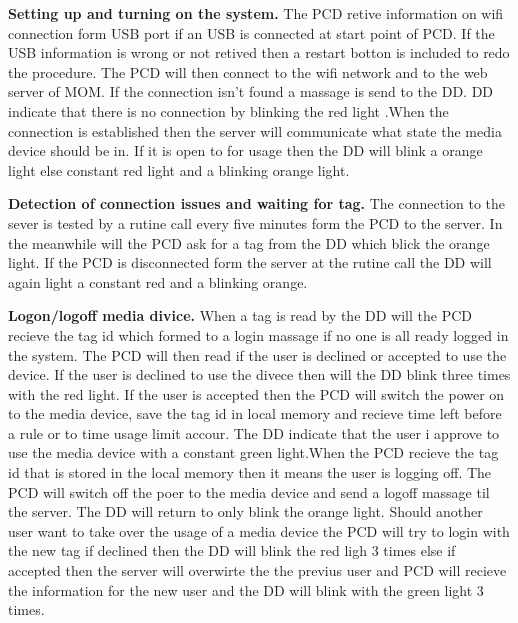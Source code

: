 \textbf{Setting up and turning on the system.} \n
The PCD retive information on wifi connection form USB port if an USB is connected at start point of PCD. 
If the USB information is wrong or not retived then a restart botton is included to redo the procedure.  \n
The PCD will then connect to the wifi network and to the web server of MOM. If the connection isn't found a massage is send to the DD. \n DD indicate that there is no connection by blinking the red light .\n When the connection is established then the server will communicate what state the media device should be in. If it is open to for usage then the DD will blink a orange light else constant red light and a blinking orange light. 

\textbf{Detection of connection issues and waiting for tag.} \n
The connection to the sever is tested by a rutine call every five minutes form the PCD to the server. In the meanwhile will the PCD ask for a tag from the DD which blick the orange light. If the PCD is disconnected form the server at the rutine call the DD will again light a constant red and a blinking orange.    
  
\textbf{Logon/logoff media divice.} \n
When a tag is read by the DD will the PCD recieve the tag id which formed to a login massage if no one is all ready logged in the system. The PCD will then read if the user is declined or accepted to use the device. If the user is declined to use the divece then will the DD blink three times with the red light. If the user is accepted then the PCD will switch the power on to the media device, save the tag id in local memory and recieve time left before a rule or to time usage limit accour. The DD indicate that the user i approve to use the media device with a constant green light.\n When the PCD recieve the tag id that is stored in the local memory then it means the user is logging off. The PCD will switch off the poer to the media device and send a logoff massage til the server. The DD will return to only blink the orange light. Should another user want to take over the usage of a media device the PCD will try to login with the new tag if declined then the DD will blink the red ligh 3 times else if accepted then the server will overwirte the the previus user and PCD will recieve the information for the new user and the DD will blink with the green light 3 times.

        

